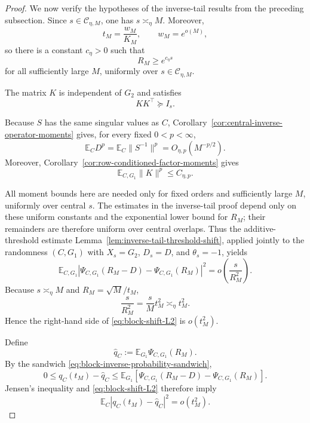 \documentclass[11pt]{article}
\newcommand{\Ebb}{\mathbb E}
\newcommand{\1}{\mathbf 1}
\begin{document}
\begin{proof}
We now verify the hypotheses of the inverse-tail results from the preceding subsection.
Since \(s\in\mathcal C_{\eta,M}\), one has \(s\asymp_\eta M\).  Moreover,
\[
        t_M=\frac{w_M}{K_M},
        \qquad
        w_M=e^{o(M)},
\]
so there is a constant \(c_\eta>0\) such that
\[
        R_M\ge e^{c_\eta s}
\]
for all sufficiently large \(M\), uniformly over
\(s\in\mathcal C_{\eta,M}\).

The matrix \(K\) is independent of \(G_2\) and satisfies
\[
        KK^\top\succeq I_s.
\]

Because \(S\) has the same singular values as \(C\),
Corollary~\ref{cor:central-inverse-operator-moments} gives, for every fixed
\(0<p<\infty\),
\begin{equation}
        \Ebb_C D^p
        =
        \Ebb_C\|S^{-1}\|^p
        =
        O_{\eta,p}(M^{-p/2}).
        \label{eq:D-central-moments}
\end{equation}
Moreover, Corollary~\ref{cor:row-conditioned-factor-moments} gives
\begin{equation}
        \Ebb_{C,G_1}\|K\|^p
        \le
        C_{\eta,p}.
        \label{eq:K-central-moments}
\end{equation}

All moment bounds here are needed only for fixed orders and sufficiently
large \(M\), uniformly over central \(s\). The estimates in the inverse-tail
proof depend only on these uniform constants and the exponential lower bound
for \(R_M\); their remainders are therefore uniform over central overlaps.
Thus the additive-threshold estimate
Lemma~\ref{lem:inverse-tail-threshold-shift}, applied jointly to the randomness
\((C,G_1)\) with \(X_s=G_2\), \(D_s=D\), and \(\theta_s=-1\), yields
\begin{equation}
        \Ebb_{C,G_1}
        \left|
        \Psi_{C,G_1}(R_M-D)
        -
        \Psi_{C,G_1}(R_M)
        \right|^2
        =
        o\left(\frac{s}{R_M^2}\right).
        \label{eq:block-shift-L2}
\end{equation}
Because \(s\asymp_\eta M\) and \(R_M=\sqrt M/t_M\),
\[
        \frac{s}{R_M^2}
        =
        \frac{s}{M}t_M^2
        \asymp_\eta t_M^2.
\]
Hence the right-hand side of \eqref{eq:block-shift-L2} is \(o(t_M^2)\).

Define
\[
        \widehat q_C
        :=
        \Ebb_{G_1}\Psi_{C,G_1}(R_M).
\]
By the sandwich \eqref{eq:block-inverse-probability-sandwich},
\[
        0
        \le
        q_C(t_M)-\widehat q_C
        \le
        \Ebb_{G_1}
        \left[
        \Psi_{C,G_1}(R_M-D)
        -
        \Psi_{C,G_1}(R_M)
        \right].
\]
Jensen's inequality and \eqref{eq:block-shift-L2} therefore imply
\begin{equation}
        \Ebb_C
        |q_C(t_M)-\widehat q_C|^2
        =
        o(t_M^2).
        \label{eq:qC-block-reduction-error}
\end{equation}


\end{proof}
\end{document}
